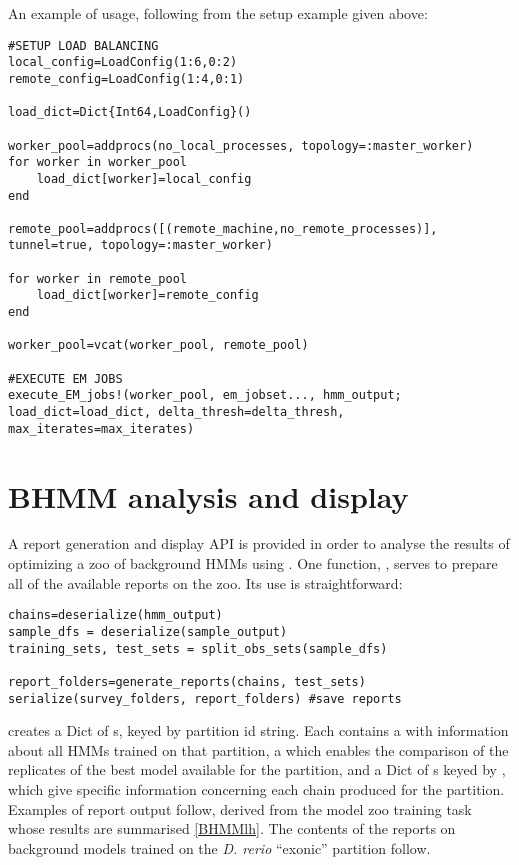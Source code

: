 An example of  usage, following from the setup example given above:

\begin{verbatim}
#SETUP LOAD BALANCING
local_config=LoadConfig(1:6,0:2)
remote_config=LoadConfig(1:4,0:1)

load_dict=Dict{Int64,LoadConfig}()

worker_pool=addprocs(no_local_processes, topology=:master_worker)
for worker in worker_pool
    load_dict[worker]=local_config
end

remote_pool=addprocs([(remote_machine,no_remote_processes)], tunnel=true, topology=:master_worker)

for worker in remote_pool
    load_dict[worker]=remote_config
end

worker_pool=vcat(worker_pool, remote_pool)

#EXECUTE EM JOBS
execute_EM_jobs!(worker_pool, em_jobset..., hmm_output; load_dict=load_dict, delta_thresh=delta_thresh, max_iterates=max_iterates)
\end{verbatim}

\section{BHMM analysis and display}
\label{sec:BBMdisplay}
A report generation and display API is provided in order to analyse the results of optimizing a zoo of background HMMs using . One function, , serves to prepare all of the available reports on the zoo. Its use is straightforward:

\begin{verbatim}
chains=deserialize(hmm_output)
sample_dfs = deserialize(sample_output)
training_sets, test_sets = split_obs_sets(sample_dfs)

report_folders=generate_reports(chains, test_sets)
serialize(survey_folders, report_folders) #save reports
\end{verbatim}

 creates a Dict of s, keyed by partition id string. Each  contains a  with information about all HMMs trained on that partition, a  which enables the comparison of the replicates of the best model available for the partition, and a Dict of s keyed by , which give specific information concerning each chain produced for the partition. Examples of report output follow, derived from the model zoo training task whose results are summarised \autoref{BHMMlh}. The contents of the reports on background models trained on the \textit{D. rerio} ``exonic'' partition follow.

